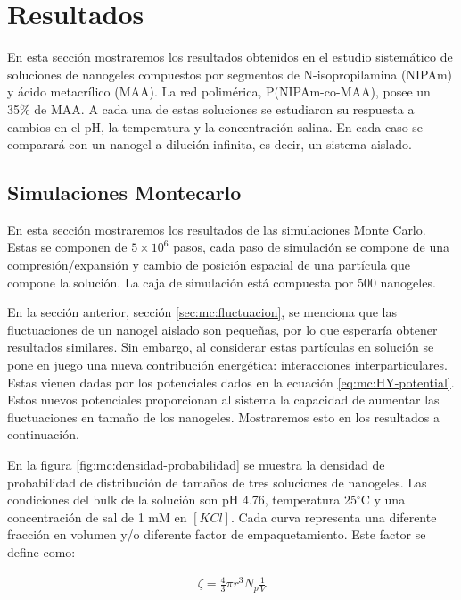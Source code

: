 	
	\section{Resultados}
	
	En esta secci\'on mostraremos los resultados obtenidos en el estudio sistem\'atico de soluciones de nanogeles compuestos por segmentos de N-isopropilamina (NIPAm) y \'acido metacr\'ilico (MAA). La red polim\'erica, P(NIPAm-co-MAA), posee un 35\% de MAA.
	A cada una de estas soluciones se estudiaron su respuesta a cambios en el pH, la temperatura y la concentraci\'on salina. En cada caso se comparar\'a con un nanogel a diluci\'on infinita, es decir, un sistema aislado.
	
	
	\subsection{Simulaciones Montecarlo}
	
	En esta secci\'on mostraremos los resultados de las simulaciones Monte Carlo. Estas se componen de  $5\times 10^6$ pasos, cada paso de simulaci\'on se compone de una compresi\'on/expansi\'on y cambio de posici\'on espacial de una part\'icula que compone la soluci\'on. La caja de simulaci\'on est\'a compuesta por 500 nanogeles.
	
	En la secci\'on anterior, secci\'on \ref{sec:mc:fluctuacion}, se menciona que las fluctuaciones de un nanogel aislado son peque\~nas, por lo que esperar\'ia obtener resultados similares. Sin embargo, al considerar estas part\'iculas en soluci\'on se pone en juego una nueva contribuci\'on energ\'etica: interacciones interparticulares. Estas vienen dadas por los potenciales dados en la ecuaci\'on \ref{eq:mc:HY-potential}.
	Estos nuevos potenciales proporcionan al sistema la capacidad de aumentar las fluctuaciones en tama\~no de los nanogeles. Mostraremos esto en los resultados a continuaci\'on.
	
	En la figura \ref{fig:mc:densidad-probabilidad} se muestra la densidad de probabilidad de distribuci\'on de tama\~nos de tres soluciones de nanogeles. Las condiciones del bulk de la soluci\'on son pH 4.76, temperatura 25$^\circ$C y una concentraci\'on de sal de 1 mM en $[KCl]$.
	Cada curva representa una diferente fracci\'on en volumen y/o diferente factor de empaquetamiento. Este factor se define como:
	
	
	
	\begin{align}
		\zeta = \frac{4}{3} \pi r^3 N_p \frac{1}{V}
	\end{align}
	
